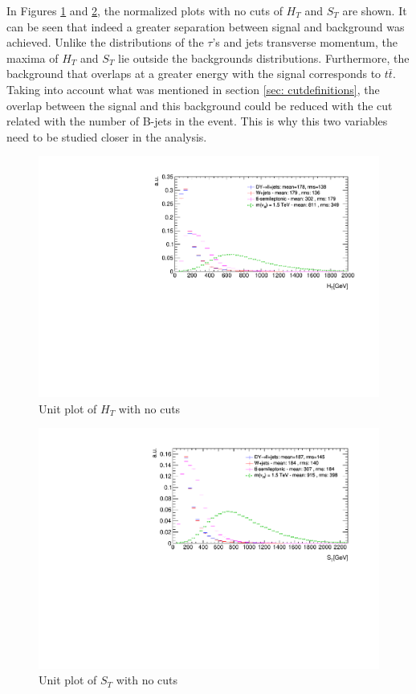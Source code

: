 In Figures \ref{fig: HTunitNC} and \ref{fig: STunitNC}, the normalized plots with no cuts of $H_{T}$ and $S_{T}$ are shown. It can be seen that indeed a greater separation between signal and background was achieved. Unlike the distributions of the $\tau$'s and jets transverse momentum, the maxima of $H_{T}$ and $S_{T}$ lie outside the backgrounds distributions. Furthermore, the background that overlaps at a greater energy with the signal corresponds to $t\bar{t}$. Taking into account what was mentioned in section \ref{sec: cutdefinitions}, the overlap between the signal and this background could be reduced with the cut related with the number of B-jets in the event. This is why this two variables need to be studied closer in the analysis.

\begin{figure}
\includegraphics[width=\linewidth]{Figures/Plots/HT_unitNC.pdf}
\caption{Unit plot of $H_{T}$ with no cuts}
\label{fig: HTunitNC}
\end{figure}

\begin{figure}
\centering
\includegraphics[width=\linewidth]{Figures/Plots/ST_unitNC.pdf}
\caption{Unit plot of $S_{T}$ with no cuts}
\label{fig: STunitNC}
\end{figure}

